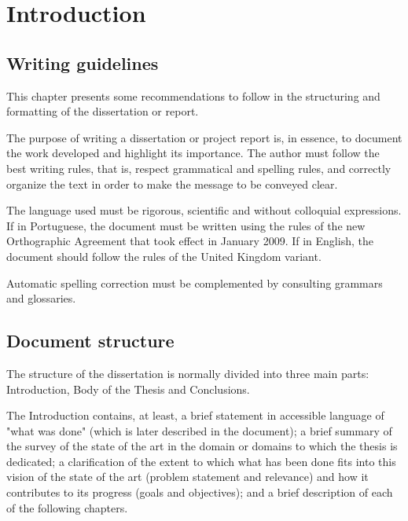 % 
\chapter{Introduction} %
\label{chap:Chapter1} %


%
\section{Writing guidelines} 
\label{sec:chap1_guidelines} %

This chapter presents some recommendations to follow in the structuring and formatting of the dissertation or report.

The purpose of writing a dissertation or project report is, in essence, to document the work developed and highlight its importance. The author must follow the best writing rules, that is, respect grammatical and spelling rules, and correctly organize the text in order to make the message to be conveyed clear. 

The language used must be rigorous, scientific and without colloquial expressions. If in Portuguese, the document must be written using the rules of the new Orthographic Agreement that took effect in January 2009. If in English, the document should follow the rules of the United Kingdom variant. 

Automatic spelling correction must be complemented by consulting grammars and glossaries.

\section{Document structure}

The structure of the dissertation is normally divided into three main parts: Introduction, Body of the Thesis and Conclusions.

The Introduction contains, at least, a brief statement in accessible language of "what was done" (which is later described in the document); a brief summary of the survey of the state of the art in the domain or domains to which the thesis is dedicated; a clarification of the extent to which what has been done fits into this vision of the state of the art (problem statement and relevance) and how it contributes to its progress (goals and objectives); and a brief description of each of the following chapters.

